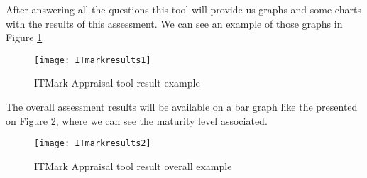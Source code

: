 After answering all the questions this tool will provide us graphs and some charts with the results of this assessment. We can see an example of those graphs in Figure \ref{fig:itmark_result1}

\begin{figure}[h]
	\begin{center}
		\leavevmode
		\texttt{[image: ITmarkresults1]}
		\caption{ITMark Appraisal tool result example}
		\label{fig:itmark_result1}
	\end{center}
\end{figure}

The overall assessment results will be available on a bar graph like the presented on Figure \ref{fig:itmark_result2}, where we can see the maturity level associated.

\begin{figure}[h]
	\begin{center}
		\leavevmode
		\texttt{[image: ITmarkresults2]}
		\caption{ITMark Appraisal tool result overall example}
		\label{fig:itmark_result2}
	\end{center}
\end{figure}